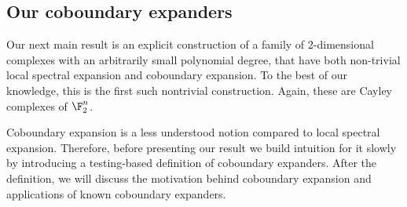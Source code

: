 


\subsection{Our coboundary expanders} \label{sec:intro-cob-exp}

Our next main result is an explicit construction of a family of $2$-dimensional complexes with an arbitrarily small polynomial degree, that have both non-trivial local spectral expansion and coboundary expansion. To the best of our knowledge, this is the first such nontrivial construction. Again, these are Cayley complexes of \(\F_2^n\).

Coboundary expansion is a less understood notion compared to local spectral expansion. Therefore, before presenting our result we build intuition for it slowly by introducing a testing-based definition of coboundary expanders. After the definition, we will discuss the motivation behind coboundary expansion and applications of known coboundary expanders.

